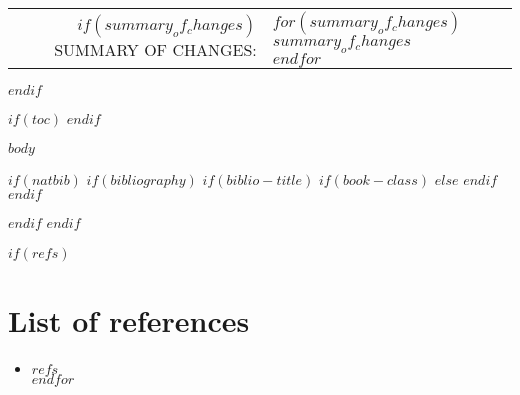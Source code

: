 \documentclass[$if(fontsize)$$fontsize$,$endif$$if(lang)$$babel-lang$,$endif$$if(papersize)$$papersize$paper,$endif$$for(classoption)$$classoption$$sep$,$endfor$]{$documentclass$}
\begin{document}
\begin{minipage}{\textwidth}
\begin{center}
\begin{tabular}{ r l }
                $if(summary_of_changes)$
                {\color{gray}SUMMARY OF CHANGES:}           & \parbox[t]{8cm}{$for(summary_of_changes)$ $summary_of_changes$ \\ $endfor$} \\

                \null & \null \\
                $endif$


            \end{tabular}
        \end{center}
    \end{minipage}
    \vfill
    \newpage
$endif$


\vspace*{1cm}

$if(toc)$
    {
        \hypersetup{linkcolor=$if(toccolor)$$toccolor$$else$black$endif$}
        \setcounter{tocdepth}{$toc-depth$}
        \tableofcontents
        \clearpage
        \newpage
    }
$endif$

\pagestyle{fancy}
$body$
\newpage

$if(natbib)$
    $if(bibliography)$
        $if(biblio-title)$
            $if(book-class)$
                \renewcommand\bibname{$biblio-title$}
            $else$
                \renewcommand\refname{$biblio-title$}
            $endif$
        $endif$
        
        \newpage
    $endif$
$endif$

\iftotalfigures{}\listoffigures\newpage\fi
\iftotaltables{}\listoftables\newpage\fi

$if(refs)$
	\section*{List of references}
	\begin{itemize}
		$for(refs)$ \item $refs$ \\ $endfor$
	\end{itemize}
	
\end{document}
